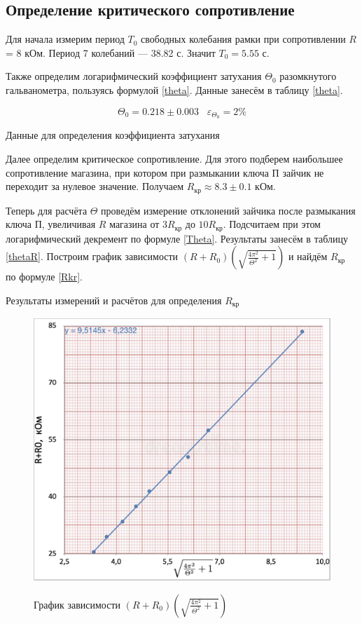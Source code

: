 \documentclass[12pt,a4paper]{article}
\begin{document}
\subsection*{Определение критического сопротивление}

Для начала измерим период $T_0$ свободных колебания рамки при сопротивлении $R$ = 8 кОм. 
Период 7 колебаний --- 38.82 с. Значит $T_0=5.55$ с.

Также определим логарифмический коэффициент затухания $\Theta_0$ разомкнутого гальванометра, пользуясь формулой \ref{theta}. Данные занесём в таблицу \ref{theta}.

$$\Theta_0 = 0.218 \pm 0.003 \;\;\; \varepsilon_{\Theta_0} = 2\%$$

\begin{table}[H]
	\caption{Данные для определения коэффициента затухания}
	
		\label{theta}
\end{table}

Далее определим критическое сопротивление. Для этого подберем наибольшее сопротивление магазина, при котором при размыкании ключа $\text{П}$ зайчик не переходит за нулевое значение. Получаем  $R_\text{кр} \approx 8.3 \pm 0.1$ кОм. 

Теперь для расчёта $ \Theta $  проведём измерение отклонений зайчика после размыкания ключа $ \text{П} $, увеличивая $ R $ магазина от $ 3R_\text{кр} $  до $ 10R_\text{кр} $. Подсчитаем при этом логарифмический декремент по формуле \eqref{Theta}. Результаты занесём в таблицу \ref{thetaR}. Построим график зависимости $(R+R_0)\left(\sqrt{\frac{4\pi^2}{\Theta^2} + 1}\right)$ и найдём $R_\text{кр}$ по формуле \ref{Rkr}.

\begin{table}[H]
	\caption{Результаты измерений и расчётов для определения $R_\text{кр}$}
	
		\label{thetaR}
\end{table}

\begin{figure}[H]
	\caption{График зависимости $(R+R_0)\left(\sqrt{\frac{4\pi^2}{\Theta^2} + 1}\right)$}
	\includegraphics[width = 9.5 cm]{src/Rkrit.png}
	\label{fig:plt2}
\end{figure}
\end{document}
